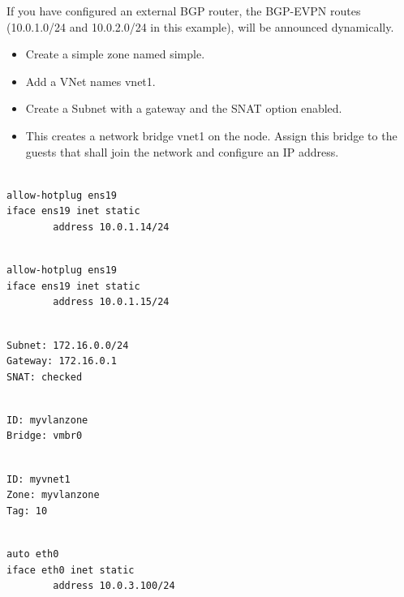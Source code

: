 If you have configured an external BGP router, the BGP-EVPN routes (10.0.1.0/24 and 10.0.2.0/24 in this example), will be announced dynamically.

\begin{itemize}[leftmargin=2cm]

	\item Create a simple zone named simple.

	\item Add a VNet names vnet1.

	\item Create a Subnet with a gateway and the SNAT option enabled.

	\item This creates a network bridge vnet1 on the node. Assign this bridge to the guests that shall join the network and configure an IP address.

\end{itemize}

\begin{lstlisting}

allow-hotplug ens19
iface ens19 inet static
        address 10.0.1.14/24

\end{lstlisting}

\begin{lstlisting}

allow-hotplug ens19
iface ens19 inet static
        address 10.0.1.15/24

\end{lstlisting}

\begin{lstlisting}

Subnet: 172.16.0.0/24
Gateway: 172.16.0.1
SNAT: checked

\end{lstlisting}

\begin{lstlisting}

ID: myvlanzone
Bridge: vmbr0

\end{lstlisting}

\begin{lstlisting}

ID: myvnet1
Zone: myvlanzone
Tag: 10

\end{lstlisting}

\begin{lstlisting}

auto eth0
iface eth0 inet static
        address 10.0.3.100/24

\end{lstlisting}

